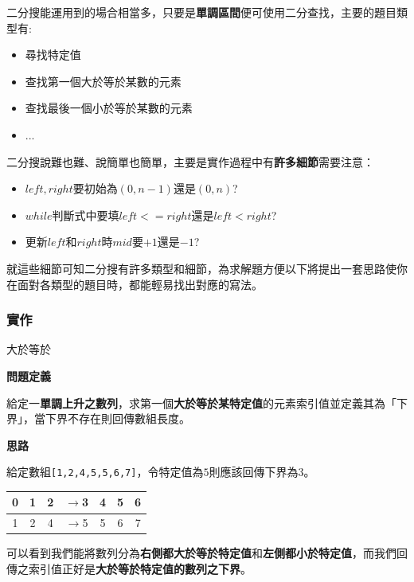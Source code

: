     二分搜能運用到的場合相當多，只要是\textbf{單調區間}便可使用二分查找，主要的題目類型有:

    \begin{itemize}
        \item 尋找特定值
        \item 查找第一個大於等於某數的元素
        \item 查找最後一個小於等於某數的元素
        \item ...
    \end{itemize}

    二分搜說難也難、說簡單也簡單，主要是實作過程中有\textbf{許多細節}需要注意：

    \begin{itemize}
        \item $left, right$要初始為$(0,n-1)$還是$(0,n)$?
        \item $while$判斷式中要填$left<=right$還是$left<right$?
        \item 更新$left$和$right$時$mid$要$+1$還是$-1$?
    \end{itemize}    

    就這些細節可知二分搜有許多類型和細節，為求解題方便以下將提出一套思路使你在面對各類型的題目時，都能輕易找出對應的寫法。

    \subsubsection{實作}

    \example 大於等於
    
    \textbf{問題定義}

    給定一\textbf{單調上升之數列}，求第一個\textbf{大於等於某特定值}的元素索引值並定義其為「下界」，當下界不存在則回傳數組長度。

    \textbf{思路}

    給定數組\verb|[1,2,4,5,5,6,7]|，令特定值為$5$則應該回傳下界為$3$。

    \begin{center}
    \begin{tabular}{|c|c|c|c|c|c|c|}
        \hline
        0 & 1 & 2 & $\to$3 & 4 & 5 & 6 \\
        \hline
        1 & 2 & 4 & $\to$5 & 5 & 6 & 7 \\
        \hline
    \end{tabular}
    \end{center}
    
    可以看到我們能將數列分為\textbf{右側都大於等於特定值}和\textbf{左側都小於特定值}，而我們回傳之索引值正好是\textbf{大於等於特定值的數列之下界}。


